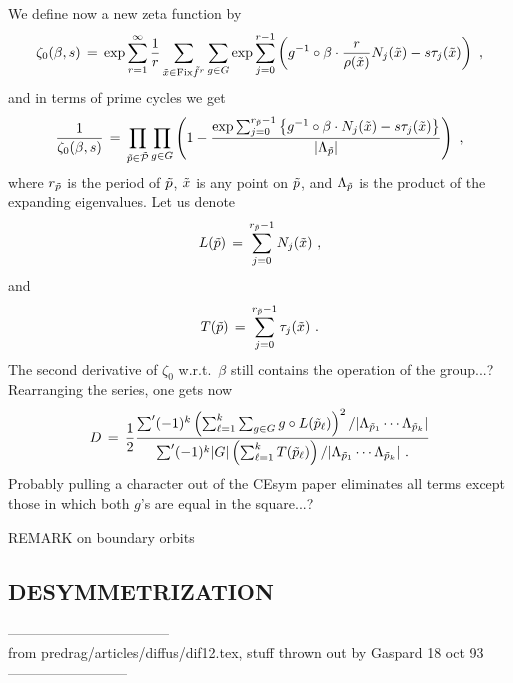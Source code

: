 We define now a new zeta function by
$$
\zeta_0(\beta,s) \,=\, \exp
\sum_{r=1}^\infty \frac{1}{ r}
\sum_{\tilde{x}\in {\rm Fix}\tilde f^r}
\sum _{g\in G}
\exp\sum_{j=0}^{r-1}
\left ({ g^{-1}\circ\beta \cdot \frac{r}{ \rho(\tilde{x})} N_j(\tilde{x})
-s\tau_j(\tilde{x})}\right )~, $$
and in terms of prime cycles we get
$$
\frac{1}{ \zeta_0(\beta ,s)} \,=\,
\prod _{\tilde p\in \tilde {\cal P}}\prod_{g\in G}
\left (1-
\frac{\exp\sum_{j=0}^{r_{\tilde p}-1} \left \{{
g^{-1}\circ\beta\cdot N_j(\tilde{x}) -s \tau_j(\tilde{x})}\right \}}{
|\Lambda_{\tilde p}|}\right )~, $$
where $r_{\tilde p}$ is the period of $\tilde p$, $\tilde{x}$ is any point
on $\tilde p$,
and $\Lambda_{\tilde p}$ is the product of the expanding eigenvalues.
Let us denote
$$
L(\tilde p) \,=\, \sum_{j=0}^{r_{\tilde p}-1} N_j(\tilde{x})~,
$$
and
$$
T(\tilde p) \,=\, \sum_{j=0}^{r_{\tilde p}-1} \tau_j(\tilde{x})~.
$$
The second derivative of $\zeta_0$ w.r.t.~$\beta$ still contains the operation of
the group...?
Rearranging the series, one gets now
$$
D \,=\,  \frac{1}{ 2}
\frac{
\mathop{{\sum}'} (-1)^k
\left (\sum_{\ell=1}^{k}\sum_{g\in G}
g\circ L(\tilde p_\ell) \right )^2 /
|\Lambda_{\tilde p_1}\cdots \Lambda_{\tilde p_k}|
}{
\mathop{{\sum}'} (-1)^k |G| \left (\sum_{\ell=1}^{k}
 T(\tilde p_\ell) \right ) /
|\Lambda_{\tilde p_1}\cdots \Lambda_{\tilde p_k}|
~.
}
$$
Probably pulling a character out of the CEsym paper eliminates all terms except
those in which both $g$'s are equal in the square...?

REMARK on boundary orbits


\subsection{DESYMMETRIZATION}

-----------------------------------\\
from predrag/articles/diffus/dif12.tex, stuff thrown out by Gaspard 18 oct 93
\\--------------------------

